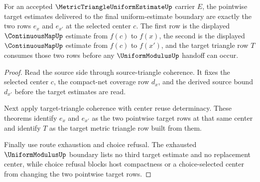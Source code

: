 \begin{theorem}
\label{thm:metric-triangle-uniform-estimate-two-point-target-boundary}
For an accepted $\MetricTriangleUniformEstimateUp$ carrier $E$, the pointwise target estimates delivered to the final uniform-estimate boundary are exactly the two rows $e_x$ and $e_{x'}$ at the selected center $c$. The first row is the displayed $\ContinuousMapUp$ estimate from $f(c)$ to $f(x)$, the second is the displayed $\ContinuousMapUp$ estimate from $f(c)$ to $f(x')$, and the target triangle row $T$ consumes those two rows before any $\UniformModulusUp$ handoff can occur.
\end{theorem}
\begin{proof}
Read the source side through source-triangle coherence. It fixes the selected center $c$, the compact-net coverage row $d_x$, and the derived source bound $d_{x'}$ before the target estimates are read.

Next apply target-triangle coherence with center reuse determinacy. These theorems identify $e_x$ and $e_{x'}$ as the two pointwise target rows at that same center and identify $T$ as the target metric triangle row built from them.

Finally use route exhaustion and choice refusal. The exhausted $\UniformModulusUp$ boundary lists no third target estimate and no replacement center, while choice refusal blocks host compactness or a choice-selected center from changing the two pointwise target rows.
\end{proof}

